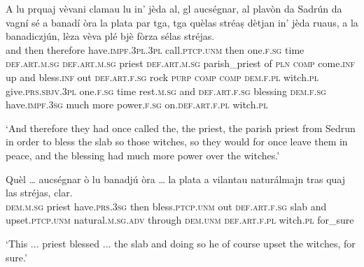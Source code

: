 \begin{linenumbers}
	\gll A lu prquaj vèvani clamau lu in’ jèda al, gl aucségnar, al plavòn da Sadrún da vagní sé a banadí òra la plata par tga, tga quèlas stréaṣ dètjan\footnotemark{} in’ jèda ruaus, a la banadiczjún, lèza vèva plé bjè fòrza sélas stréjas.\\
and then therefore have.\textsc{impf.3pl.3pl} call.\textsc{ptcp.unm} then one.\textsc{f.sg} time \textsc{def.art.m.sg} \textsc{def.art.m.sg} priest \textsc{def.art.m.sg} parish\_priest of \textsc{pln} \textsc{comp} come.\textsc{inf} up and bless.\textsc{inf} out \textsc{def.art.f.sg} rock \textsc{purp} \textsc{comp} \textsc{comp} \textsc{dem.f.pl} witch.\textsc{pl} give.\textsc{prs.sbjv.3pl} one.\textsc{f.sg} time rest.\textsc{m.sg} and \textsc{def.art.f.sg} blessing \textsc{dem.f.sg} have.\textsc{impf.3sg} much more power.\textsc{f.sg} on.\textsc{def.art.f.pl} witch.\textsc{pl}\\
\end{linenumbers}
\medskip
\glt `And therefore they had once called the, the priest, the parish priest from Sedrun in order to bless the slab so those witches, so they would for once leave them in peace, and the blessing had much more power over the witches.'
\medskip

\begin{linenumbers}
	\gll 
Quèl … aucségnar ò lu banadjú òra … la plata a vilantau naturálmajn tras quaj las stréjas, clar.\\
\textsc{dem.m.sg} { } priest have.\textsc{prs.3sg} then bless.\textsc{ptcp.unm} out {} \textsc{def.art.f.sg} slab and upset.\textsc{ptcp.unm} natural.\textsc{m.sg.adv} through \textsc{dem.unm} \textsc{def.art.f.pl} witch.\textsc{pl} for\_sure\\
\end{linenumbers}
\medskip
\glt `This ... priest blessed ... the slab and doing so he of course upset the witches, for sure.'
\medskip

